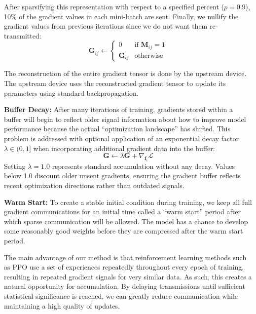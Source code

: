 After sparsifying this representation with respect to a specified percent ($p=0.9$), 10\% of the gradient values in each mini-batch are sent. Finally, we nullify the gradient values from previous iterations since we do not want them re-transmitted:
\begin{equation}
\mathbf{G}_{ij} \leftarrow \begin{cases}
0 & \text{if } \mathbf{M}_{ij} = 1 \\
\mathbf{G}_{ij} & \text{otherwise}
\end{cases}
\end{equation}

The reconstruction of the entire gradient tensor is done by the upstream device. The upstream device uses the reconstructed gradient tensor to update its parameters using standard backpropagation.

\textbf{Buffer Decay:} After many iterations of training, gradients stored within a buffer will begin to reflect older signal information about how to improve model performance because the actual ``optimization landscape'' has shifted. This problem is addressed with optional application of an exponential decay factor $\lambda \in (0, 1]$ when incorporating additional gradient data into the buffer:
\begin{equation}
\mathbf{G} \leftarrow \lambda \mathbf{G} + \nabla_{\mathbf{f}_i} \mathcal{L}
\end{equation}
Setting $\lambda = 1.0$ represents standard accumulation without any decay. Values below 1.0 discount older unsent gradients, ensuring the gradient buffer reflects recent optimization directions rather than outdated signals.

\textbf{Warm Start:} To create a stable initial condition during training, we keep all full gradient communications for an initial time called a ``warm start'' period after which sparse communication will be allowed. The model has a chance to develop some reasonably good weights before they are compressed after the warm start period.

The main advantage of our method is that reinforcement learning methods such as PPO use a set of experiences repeatedly throughout every epoch of training, resulting in repeated gradient signals for very similar data. As such, this creates a natural opportunity for accumulation. By delaying transmissions until sufficient statistical significance is reached, we can greatly reduce communication while maintaining a high quality of updates.

